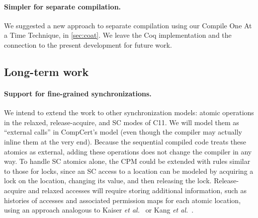 \paragraph{Simpler for separate compilation.} We suggested a new approach to separate compilation using our Compile One At a Time Technique, in \autoref{sec:coat}. We leave the Coq implementation and the connection to the present development for future work.

\subsection{Long-term work}


\paragraph{Support for fine-grained synchronizations.}
We intend to extend the work to other synchronization models: atomic
operations in the relaxed, release-acquire,
and SC modes of C11.  We will model them as ``external calls'' in CompCert's
model (even though the compiler may actually inline
them  at the very end).  Because the sequential compiled code treats these atomics as external, adding these operations does not
change the compiler in any way.  To handle SC atomics alone, the CPM
could be extended with rules similar to those for locks, since an SC
access to a location can be modeled by acquiring a lock on the
location, changing its value, and then releasing the
lock. Release-acquire and relaxed accesses will require storing
additional information, such as histories of accesses and associated
permission maps for each atomic location, using an approach analogous
to Kaiser \emph{et al.}~\cite{Iris-weak} or Kang \emph{et al.}~\cite{Kang2017promising}.


